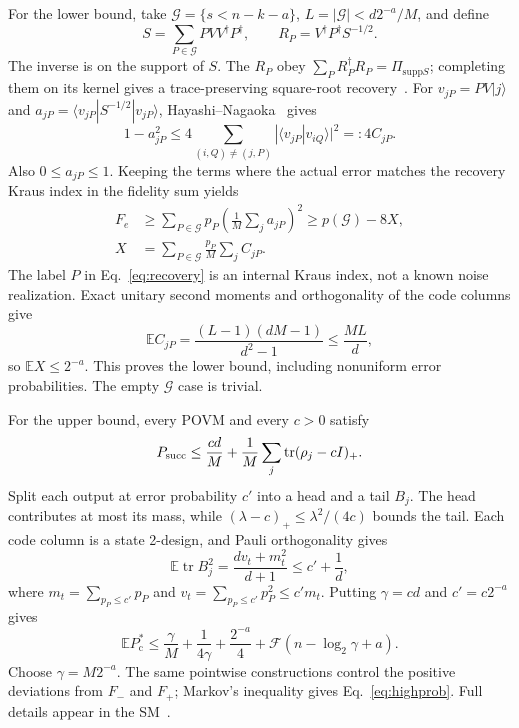 \documentclass[aps,prl,reprint,superscriptaddress,amsmath,amssymb]{revtex4-2}
\newcommand{\E}{\mathbb E}
\newcommand{\tr}{\operatorname{tr}}
\newcommand{\Pc}{P_{\mathrm c}^{*}}
\newcommand{\Fs}{\mathcal F}
\begin{document}
For the lower bound, take $\mathcal G=\{s<n-k-a\}$,
$L=|\mathcal G|<d2^{-a}/M$, and define
\begin{equation}
S=\sum_{P\in\mathcal G}PVV^\dagger P^\dagger,\qquad
R_P=V^\dagger P^\dagger S^{-1/2}.
\label{eq:recovery}
\end{equation}
The inverse is on the support of $S$. The $R_P$ obey
$\sum_PR_P^\dagger R_P=\Pi_{\mathrm{supp}S}$; completing them on its kernel
gives a trace-preserving square-root recovery~\cite{BarnumKnill}. For
$v_{jP}=PV|j\rangle$ and $a_{jP}=\langle v_{jP}|S^{-1/2}|v_{jP}\rangle$,
Hayashi--Nagaoka~\cite{HayashiNagaoka} gives
\begin{equation}
1-a_{jP}^2\le4\!\sum_{(i,Q)\ne(j,P)}|\langle v_{jP}|v_{iQ}\rangle|^2
=:4C_{jP}.
\end{equation}
Also $0\le a_{jP}\le1$. Keeping the terms where the actual error matches
the recovery Kraus index in the fidelity sum yields
\begin{align}
F_e&\ge\sum_{P\in\mathcal G}p_P\left(\frac1M\sum_ja_{jP}\right)^2
\ge p(\mathcal G)-8X,\nonumber\\
X&=\sum_{P\in\mathcal G}\frac{p_P}{M}\sum_jC_{jP}.
\label{eq:loss}
\end{align}
The label $P$ in Eq.~\eqref{eq:recovery} is an internal Kraus index, not a
known noise realization. Exact unitary second moments and orthogonality of
the code columns give
\begin{equation}
\E C_{jP}=\frac{(L-1)(dM-1)}{d^2-1}\le\frac{ML}{d},
\end{equation}
so $\E X\le2^{-a}$. This proves the lower bound, including nonuniform error
probabilities. The empty $\mathcal G$ case is trivial.

For the upper bound, every POVM and every $c>0$ satisfy
\begin{equation}
P_{\rm succ}\le\frac{cd}{M}+\frac1M\sum_j\tr(\rho_j-cI)_+.
\end{equation}
Split each output at error probability $c'$ into a head and a tail $B_j$.
The head contributes at most its mass, while
$(\lambda-c)_+\le\lambda^2/(4c)$ bounds the tail. Each code column is a state
2-design, and Pauli orthogonality gives
\begin{equation}
\E\tr B_j^2=\frac{dv_t+m_t^2}{d+1}\le c'+\frac1d,
\end{equation}
where $m_t=\sum_{p_P\le c'}p_P$ and $v_t=\sum_{p_P\le c'}p_P^2\le c'm_t$.
Putting $\gamma=cd$ and $c'=c2^{-a}$ gives
\begin{equation}
\E\Pc\le\frac\gamma M+\frac1{4\gamma}+\frac{2^{-a}}4
+\Fs(n-\log_2\gamma+a).
\label{eq:generalupper}
\end{equation}
Choose $\gamma=M2^{-a}$. The same pointwise constructions control the
positive deviations from $F_-$ and $F_+$; Markov's inequality gives
Eq.~\eqref{eq:highprob}. Full details appear in the SM~\cite{SM}.
\end{document}
